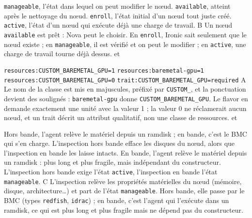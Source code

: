   {\texttt{manageable}, l'état dans lequel on peut modifier le nœud.}
  {\texttt{available}, atteint après le nettoyage du nœud.}
  {\texttt{enroll}, l'état initial d'un nœud tout juste créé.}
  {\texttt{active}, l'état d'un nœud qui exécute déjà une charge de travail.}
  {B}
  {Un nœud \texttt{available} est prêt : Nova peut le choisir. En \texttt{enroll}, Ironic sait seulement que le nœud existe ; en \texttt{manageable}, il est vérifié et on peut le modifier ; en \texttt{active}, une charge de travail tourne déjà dessus.}
  { et }

  {\texttt{resources:CUSTOM\_BAREMETAL\_GPU=1}}
  {\texttt{resources:baremetal-gpu=1}}
  {\texttt{resources:CUSTOM\_BAREMETAL\_GPU=0}}
  {\texttt{trait:CUSTOM\_BAREMETAL\_GPU=required}}
  {A}
  {Le nom de la classe est mis en majuscules, préfixé par \texttt{CUSTOM\_}, et la ponctuation devient des soulignés : \texttt{baremetal-gpu} donne \texttt{CUSTOM\_BAREMETAL\_GPU}. Le flavor en demande exactement une unité avec la valeur 1 ; la valeur 0 ne réclamerait aucun nœud, et un trait décrit un attribut qualitatif, non une classe de ressources.}
  { et }

  {Hors bande, l'agent relève le matériel depuis un ramdisk ; en bande, c'est le BMC qui s'en charge.}
  {L'inspection hors bande efface les disques du nœud, alors que l'inspection en bande les laisse intacts.}
  {En bande, l'agent relève le matériel depuis un ramdisk : plus long et plus fragile, mais indépendant du constructeur.}
  {L'inspection hors bande exige l'état \texttt{active}, l'inspection en bande l'état \texttt{manageable}.}
  {C}
  {L'inspection relève les propriétés matérielles du nœud (mémoire, disque, architecture\dots) et part de l'état \texttt{manageable}. Hors bande, elle passe par le BMC (types \texttt{redfish}, \texttt{idrac}) ; en bande, c'est l'agent qui l'exécute dans un ramdisk, ce qui est plus long et plus fragile mais ne dépend pas du constructeur.}
  {}

